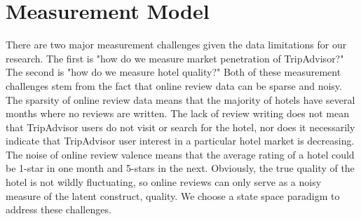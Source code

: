 \documentclass[mksc,blindrev]{informs3} %
\begin{document}

\section*{Measurement Model} \label{sec:measurement}

There are two major measurement challenges given the data limitations for our research. The first is "how do we measure market penetration of TripAdvisor?" The second is "how do we measure hotel quality?" Both of these measurement challenges stem from the fact that online review data can be sparse and noisy. The sparsity of online review data means that the majority of hotels have several months where no reviews are written. The lack of review writing does not mean that TripAdvisor users do not visit or search for the hotel, nor does it necessarily indicate that TripAdvisor user interest in a particular hotel market is decreasing. The noise of online review valence means that the average rating of a hotel could be 1-star in one month and 5-stars in the next. Obviously, the true quality of the hotel is not wildly fluctuating, so online reviews can only serve as a noisy measure of the latent construct, quality. We choose a state space paradigm to address these challenges. 
\end{document}
